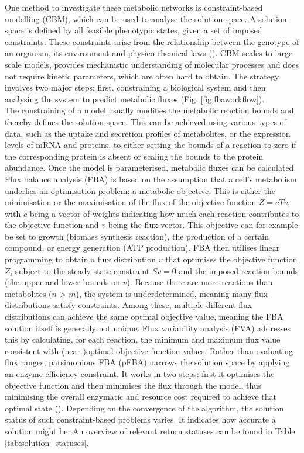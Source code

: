 One method to investigate these metabolic networks is constraint-based modelling (CBM), which can be used to analyse the solution space. A solution space is defined by all feasible phenotypic states, given a set of imposed constraints. These constraints arise from the relationship between the genotype of an organism, its environment and physico-chemical laws (\cite{bordbar_constraint-based_2014}). CBM scales to large-scale models, provides mechanistic understanding of molecular processes and does not require kinetic parameters, which are often hard to obtain. The strategy involves two major steps: first, constraining a biological system and then analysing the system to predict metabolic fluxes (Fig. \ref{fig:fbaworkflow}). 
\\


The constraining of a model usually modifies the metabolic reaction bounds and thereby defines the solution space. This can be achieved using various types of data, such as the uptake and secretion profiles of metabolites, or the expression levels of mRNA and proteins, to either setting the bounds of a reaction to zero if the corresponding protein is absent or scaling the bounds to the protein abundance. Once the model is parameterised, metabolic fluxes can be calculated. Flux balance analysis (FBA) is based on the assumption that a cell’s metabolism underlies an optimisation problem: a metabolic objective. This is either the minimisation or the maximisation of the flux of the objective function $Z = cTv$, with $c$ being a vector of weights indicating how much each reaction contributes to the objective function and $v$ being the flux vector. This objective can for example be set to growth (biomass synthesis reaction), the production of a certain compound, or energy generation (ATP production). FBA then utilises linear programming to obtain a flux distribution $v$ that optimises the objective function $Z$, subject to the steady-state constraint $Sv = 0$ and the imposed reaction bounds (the upper and lower bounds on $v$). Because there are more reactions than metabolites ($n$ > $m$), the system is underdetermined, meaning many flux distributions satisfy constraints. Among these, multiple different flux distributions can achieve the same optimal objective value, meaning the FBA solution itself is generally not unique. Flux variability analysis (FVA) addresses this by calculating, for each reaction, the minimum and maximum flux value consistent with (near-)optimal objective function values. Rather than evaluating flux ranges, parsimonious FBA (pFBA) narrows the solution space by applying an enzyme-efficiency constraint. It works in two steps: first it optimises the objective function and then minimises the flux through the model, thus minimising the overall enzymatic and resource cost required to achieve that optimal state (\cite{lewis_constraining_2012, orth_what_2010}). 
Depending on the convergence of the algorithm, the solution status of such constraint-based problems varies. It indicates how accurate a solution might be. An overview of relevant return statuses can be found in Table \ref{tab:solution_statuses}. 

